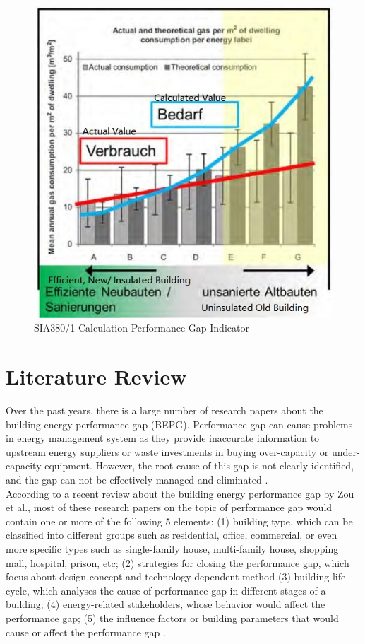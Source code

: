 \documentclass[a4paper, oneside]{discothesis}
\begin{document}
		\begin{figure}[!ht]
		\centering
		\includegraphics[scale=0.65]{SIA380Issue.jpg}
		\caption{SIA380/1 Calculation Performance Gap Indicator \cite{SIAPreviousreport}}
		\label{fig:SIA380PG}
		\end{figure}


\chapter{Literature Review}
	Over the past years, there is a large number of research papers about the building energy performance gap (BEPG). Performance gap can cause problems in energy management system as they provide inaccurate information to upstream energy suppliers or waste investments in buying over-capacity or under-capacity equipment. However, the root cause of this gap is not clearly identified, and the gap can not be effectively managed and eliminated \cite{FREI2017421}.\\
	
	According to a recent review about the building energy performance gap by Zou et al.\cite{ZOU2018165}, most of these research papers on the topic of performance gap would contain one or more of the following 5 elements: (1) building type, which can be classified into different groups such as residential, office, commercial, or even more specific types such as single-family house, multi-family house, shopping mall, hospital, prison, etc; (2) strategies for closing the performance gap, which focus about design concept and technology dependent method (3) building life cycle, which analyses the cause of performance gap in different stages of a building; (4) energy-related stakeholders, whose behavior would affect the performance gap; (5) the influence factors or building parameters that would cause or affect the performance gap \cite{FREI2017421,ZOU2018165}.\\
	
\end{document}
